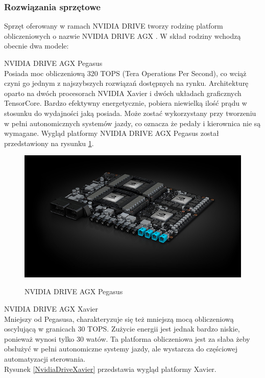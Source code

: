 \subsubsection{Rozwiązania sprzętowe}
Sprzęt oferowany w ramach NVIDIA DRIVE tworzy rodzinę platform obliczeniowych o nazwie NVIDIA DRIVE AGX \cite{nvidiaDrive:hardware}. W skład rodziny wchodzą obecnie dwa modele:
\vspace{-0.3cm}
\begin{enumerate*}
\item NVIDIA DRIVE AGX Pegasus \\
Posiada moc obliczeniową 320 TOPS (Tera Operations Per Second), co wciąż czyni go jednym z najszybszych rozwiązań dostępnych na rynku.
Architekturę oparto na dwóch procesorach NVIDIA Xavier i dwóch układach graficznych TensorCore. Bardzo efektywny energetycznie, pobiera niewielką ilość prądu w stosunku do wydajności jaką posiada. Może zostać wykorzystany przy tworzeniu w pełni autonomicznych systemów jazdy, co oznacza że pedały i kierownica nie są wymagane. Wygląd platformy NVIDIA DRIVE AGX Pegasus został przedstawiony na rysunku \ref{NvidiaDrivePegasus}. \\
\begin{figure}[h]
\begin{center}
\includegraphics[width=14.5cm]{resources/figures/nv-drive-pegasus.jpg}
\caption{NVIDIA DRIVE AGX Pegasus}
\label{NvidiaDrivePegasus}
\end{center}
\end{figure}
\newpage
\item NVIDIA DRIVE AGX Xavier \\
Mniejszy od Pegasusa, charakteryzuje się też mniejszą mocą obliczeniową oscylującą w granicach 30 TOPS. Zużycie energii jest jednak bardzo niskie, ponieważ wynosi tylko 30 watów. Ta platforma obliczeniowa jest za słaba żeby obsłużyć w pełni autonomiczne systemy jazdy, ale wystarcza do częściowej automatyzacji sterowania. \\
Rysunek \ref{NvidiaDriveXavier} przedstawia wygląd platformy Xavier. \\


\end{enumerate*}
